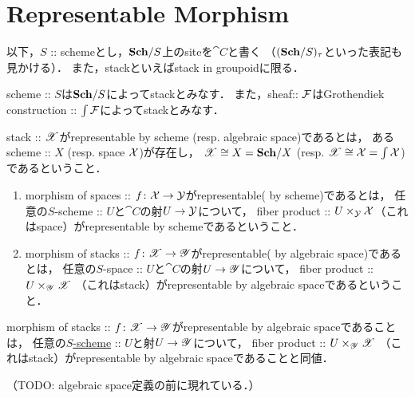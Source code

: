 \documentclass[a4paper, dvipdfmx]{jsarticle}
\begin{document}
\section{Representable Morphism}
\begin{Remark}
    以下，$S$ :: schemeとし，$\mathbf{Sch}/S$上のsiteを$\cat{C}$と書く
    （$(\mathbf{Sch}/S)_{\tau}$といった表記も見かける）．
    また，stackといえばstack in groupoidに限る．
\end{Remark}

\begin{Remark}
    scheme :: $S$は$\mathbf{Sch}/S$によってstackとみなす．
    また，sheaf:: $\mathcal{F}$はGrothendiek construction :: $\int \mathcal{F}$によってstackとみなす．
\end{Remark}

\begin{Def}
    stack :: $\mathscr{X}$がrepresentable by scheme (resp. algebraic space)であるとは，
    あるscheme :: $X$ (resp. space $\mathcal{X}$)が存在し，
    $\mathscr{X} \cong X=\mathbf{Sch}/X$ (resp. $\mathscr{X} \cong \mathcal{X}=\int \mathcal{X}$)であるということ．
\end{Def}

\begin{Def}
    \enumfix
\begin{enumerate}
\item
    morphism of spaces :: $f \colon \mathcal{X} \to \mathcal{Y}$がrepresentable( by scheme)であるとは，
    任意の$S$-scheme :: $U$と$\cat{C}$の射$U \to \mathcal{Y}$について，
    fiber product :: $U \times_{\mathcal{Y}} \mathcal{X}$（これはspace）がrepresentable by schemeであるということ．

\item
    morphism of stacks :: $f \colon \mathscr{X} \to \mathscr{Y}$がrepresentable( by algebraic space)であるとは，
    任意の$S$-space :: $U$と$\cat{C}$の射$U \to \mathscr{Y}$について，
    fiber product :: $U \times_{\mathscr{Y}} \mathscr{X}$
    （これはstack）がrepresentable by algebraic spaceであるということ．
\end{enumerate}
\end{Def}

\begin{Lemma}
    morphism of stacks :: $f \colon \mathscr{X} \to \mathscr{Y}$がrepresentable by algebraic spaceであることは，
    任意の\underline{$S$-scheme} :: $U$と射$U \to \mathscr{Y}$について，
    fiber product :: $U \times_{\mathscr{Y}} \mathscr{X}$
    （これはstack）がrepresentable by algebraic spaceであることと同値．
\end{Lemma}
（TODO: algebraic space定義の前に現れている．）
\end{document}
